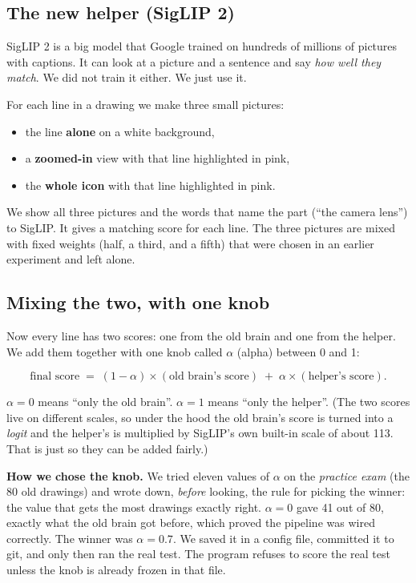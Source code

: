 \documentclass[11pt,a4paper]{article}
\begin{document}
\subsection*{The new helper (SigLIP 2)}

SigLIP 2 is a big model that Google trained on hundreds of millions of pictures with captions.
It can look at a picture and a sentence and say \emph{how well they match}.
We did not train it either. We just use it.

For each line in a drawing we make three small pictures:
\begin{itemize}[leftmargin=1.6em]
  \item the line \textbf{alone} on a white background,
  \item a \textbf{zoomed-in} view with that line highlighted in pink,
  \item the \textbf{whole icon} with that line highlighted in pink.
\end{itemize}
We show all three pictures and the words that name the part (``the camera lens'') to SigLIP.
It gives a matching score for each line. The three pictures are mixed with fixed weights (half, a third, and a fifth) that were chosen in an earlier experiment and left alone.

\subsection*{Mixing the two, with one knob}

Now every line has two scores: one from the old brain and one from the helper.
We add them together with one knob called $\alpha$ (alpha) between 0 and 1:

\[
\text{final score} \;=\; (1-\alpha)\times(\text{old brain's score}) \;+\; \alpha\times(\text{helper's score}).
\]

$\alpha = 0$ means ``only the old brain''. $\alpha = 1$ means ``only the helper''.
(The two scores live on different scales, so under the hood the old brain's score is turned into a \emph{logit} and the helper's is multiplied by SigLIP's own built-in scale of about 113. That is just so they can be added fairly.)

\textbf{How we chose the knob.} We tried eleven values of $\alpha$ on the \emph{practice exam} (the 80 old drawings) and wrote down, \emph{before} looking, the rule for picking the winner: the value that gets the most drawings exactly right.
$\alpha = 0$ gave 41 out of 80, exactly what the old brain got before, which proved the pipeline was wired correctly.
The winner was $\alpha = 0.7$. We saved it in a config file, committed it to git, and only then ran the real test.
The program refuses to score the real test unless the knob is already frozen in that file.
\end{document}
